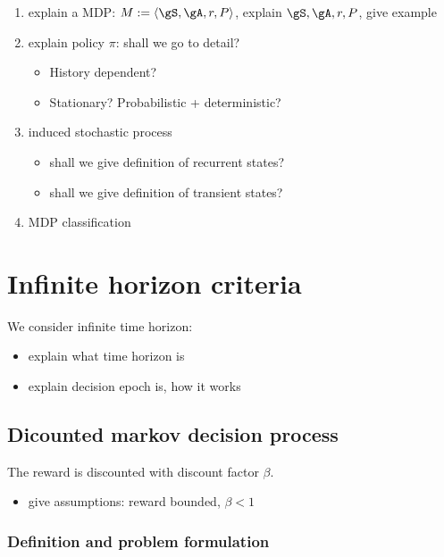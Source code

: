 \begin{enumerate}
    \item explain a MDP: $M:=\langle\gS, \gA, r, P\rangle$, explain $\gS, \gA, r, P$, give example
    \item explain policy $\pi$: shall we go to detail?
        \begin{itemize}
            \item History dependent?
            \item Stationary? Probabilistic + deterministic?
        \end{itemize}
    \item induced stochastic process
        \begin{itemize}
            \item shall we give definition of recurrent states?
            \item shall we give definition of transient states?
        \end{itemize}
    \item MDP classification
\end{enumerate}

\section{Infinite horizon criteria}

We consider infinite time horizon:
\begin{itemize}
    \item explain what time horizon is
    \item explain decision epoch is, how it works
\end{itemize}

\subsection{Dicounted markov decision process}

The reward is discounted with discount factor $\beta$.

\begin{itemize}
    \item give assumptions: reward bounded, $\beta<1$
\end{itemize}

\subsubsection{Definition and problem formulation}

